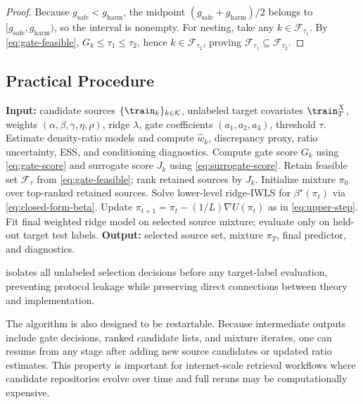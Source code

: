 \documentclass{article} %
\begin{document}
\begin{proof}
Because \(g_{\mathrm{safe}}<g_{\mathrm{harm}}\), the midpoint \((g_{\mathrm{safe}}+g_{\mathrm{harm}})/2\) belongs to \([g_{\mathrm{safe}},g_{\mathrm{harm}})\), so the interval is nonempty. For nesting, take any \(k\in\mathcal{F}_{\tau_1}\). By \eqref{eq:gate-feasible}, \(G_k\le\tau_1\le\tau_2\), hence \(k\in\mathcal{F}_{\tau_2}\), proving \(\mathcal{F}_{\tau_1}\subseteq\mathcal{F}_{\tau_2}\).
\end{proof}

\subsection{Practical Procedure}
\begin{algorithm}[t]
\caption{Stability-aware bilevel source selection without target labels}
\label{alg:stability-bilevel}
\begin{algorithmic}[1]
\STATE \textbf{Input:} candidate sources \(\{\train_k\}_{k\in\mathcal{K}}\), unlabeled target covariates \(\train_T^X\), weights \((\alpha,\beta,\gamma,\eta,\rho)\), ridge \(\lambda\), gate coefficients \((a_1,a_2,a_3)\), threshold \(\tau\).
\STATE Estimate density-ratio models and compute \(\hat w_k\), discrepancy proxy, ratio uncertainty, ESS, and conditioning diagnostics.
\STATE Compute gate score \(G_k\) using \eqref{eq:gate-score} and surrogate score \(J_k\) using \eqref{eq:surrogate-score}.
\ENDFOR
\STATE Retain feasible set \(\mathcal{F}_\tau\) from \eqref{eq:gate-feasible}; rank retained sources by \(J_k\).
\STATE Initialize mixture \(\pi_0\) over top-ranked retained sources.
\STATE Solve lower-level ridge-IWLS for \(\beta^{\star}(\pi_t)\) via \eqref{eq:closed-form-beta}.
\STATE Update \(\pi_{t+1}=\pi_t-(1/L)\nabla U(\pi_t)\) as in \eqref{eq:upper-step}.
\ENDFOR
\STATE Fit final weighted ridge model on selected source mixture; evaluate only on held-out target test labels.
\STATE \textbf{Output:} selected source set, mixture \(\pi_T\), final predictor, and diagnostics.
\end{algorithmic}
\end{algorithm}

 isolates all unlabeled selection decisions before any target-label evaluation, preventing protocol leakage while preserving direct connections between theory and implementation.

The algorithm is also designed to be restartable. Because intermediate outputs include gate decisions, ranked candidate lists, and mixture iterates, one can resume from any stage after adding new source candidates or updated ratio estimates. This property is important for internet-scale retrieval workflows where candidate repositories evolve over time and full reruns may be computationally expensive.
\end{document}
